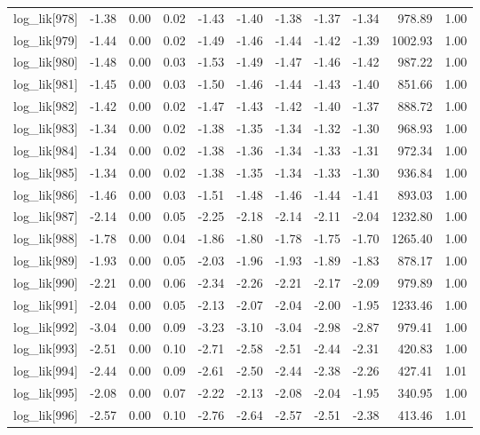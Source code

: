 \begin{table}[ht]
\begin{tabular}{rrrrrrrrrrr}
  log\_lik[978] & -1.38 & 0.00 & 0.02 & -1.43 & -1.40 & -1.38 & -1.37 & -1.34 & 978.89 & 1.00 \\ 
  log\_lik[979] & -1.44 & 0.00 & 0.02 & -1.49 & -1.46 & -1.44 & -1.42 & -1.39 & 1002.93 & 1.00 \\ 
  log\_lik[980] & -1.48 & 0.00 & 0.03 & -1.53 & -1.49 & -1.47 & -1.46 & -1.42 & 987.22 & 1.00 \\ 
  log\_lik[981] & -1.45 & 0.00 & 0.03 & -1.50 & -1.46 & -1.44 & -1.43 & -1.40 & 851.66 & 1.00 \\ 
  log\_lik[982] & -1.42 & 0.00 & 0.02 & -1.47 & -1.43 & -1.42 & -1.40 & -1.37 & 888.72 & 1.00 \\ 
  log\_lik[983] & -1.34 & 0.00 & 0.02 & -1.38 & -1.35 & -1.34 & -1.32 & -1.30 & 968.93 & 1.00 \\ 
  log\_lik[984] & -1.34 & 0.00 & 0.02 & -1.38 & -1.36 & -1.34 & -1.33 & -1.31 & 972.34 & 1.00 \\ 
  log\_lik[985] & -1.34 & 0.00 & 0.02 & -1.38 & -1.35 & -1.34 & -1.33 & -1.30 & 936.84 & 1.00 \\ 
  log\_lik[986] & -1.46 & 0.00 & 0.03 & -1.51 & -1.48 & -1.46 & -1.44 & -1.41 & 893.03 & 1.00 \\ 
  log\_lik[987] & -2.14 & 0.00 & 0.05 & -2.25 & -2.18 & -2.14 & -2.11 & -2.04 & 1232.80 & 1.00 \\ 
  log\_lik[988] & -1.78 & 0.00 & 0.04 & -1.86 & -1.80 & -1.78 & -1.75 & -1.70 & 1265.40 & 1.00 \\ 
  log\_lik[989] & -1.93 & 0.00 & 0.05 & -2.03 & -1.96 & -1.93 & -1.89 & -1.83 & 878.17 & 1.00 \\ 
  log\_lik[990] & -2.21 & 0.00 & 0.06 & -2.34 & -2.26 & -2.21 & -2.17 & -2.09 & 979.89 & 1.00 \\ 
  log\_lik[991] & -2.04 & 0.00 & 0.05 & -2.13 & -2.07 & -2.04 & -2.00 & -1.95 & 1233.46 & 1.00 \\ 
  log\_lik[992] & -3.04 & 0.00 & 0.09 & -3.23 & -3.10 & -3.04 & -2.98 & -2.87 & 979.41 & 1.00 \\ 
  log\_lik[993] & -2.51 & 0.00 & 0.10 & -2.71 & -2.58 & -2.51 & -2.44 & -2.31 & 420.83 & 1.00 \\ 
  log\_lik[994] & -2.44 & 0.00 & 0.09 & -2.61 & -2.50 & -2.44 & -2.38 & -2.26 & 427.41 & 1.01 \\ 
  log\_lik[995] & -2.08 & 0.00 & 0.07 & -2.22 & -2.13 & -2.08 & -2.04 & -1.95 & 340.95 & 1.00 \\ 
  log\_lik[996] & -2.57 & 0.00 & 0.10 & -2.76 & -2.64 & -2.57 & -2.51 & -2.38 & 413.46 & 1.01 \\ 

\end{tabular}
\end{table}

